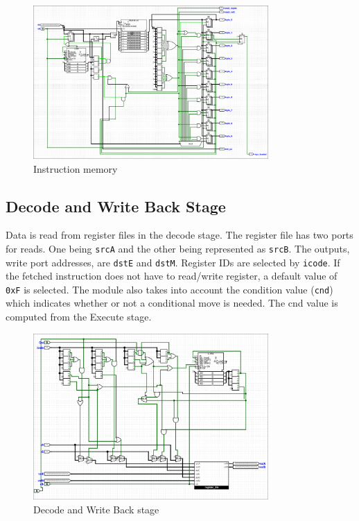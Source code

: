 \documentclass{article}
\begin{document}
\begin{figure}[H]
    \centering
    \includegraphics[width=0.8\textwidth]{./images/instruction_memory.png}
    \caption{Instruction memory}
\end{figure}

\subsection{Decode and Write Back Stage}

Data is read from register files in the decode stage. 
The register file has two ports for reads. 
One being \lstinline{srcA} and the other being represented as \lstinline{srcB}. 
The outputs, write port addresses, are \lstinline{dstE} and \lstinline{dstM}. 
Register IDs are selected by \lstinline{icode}.
If the fetched instruction does not have to read/write register, a default value of \lstinline{0xF} is selected. 
The module also takes into account the condition value (\lstinline{cnd}) which indicates whether or not a conditional move is needed. 
The cnd value is computed from the Execute stage. 

\begin{figure}[H]
    \centering
    \includegraphics[width=0.8\textwidth]{./images/decode_write_back.png}
    \caption{Decode and Write Back stage}
\end{figure}
\end{document}
